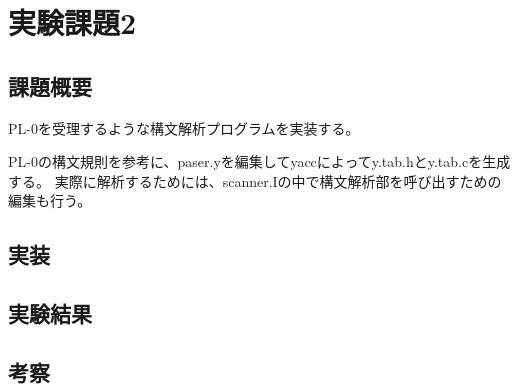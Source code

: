 \section{実験課題2}
\subsection{課題概要}
PL-0を受理するような構文解析プログラムを実装する。

PL-0の構文規則を参考に、paser.yを編集してyaccによってy.tab.hとy.tab.cを生成する。
実際に解析するためには、scanner.Iの中で構文解析部を呼び出すための編集も行う。

\subsection{実装}


\subsection{実験結果}

\subsection{考察}
